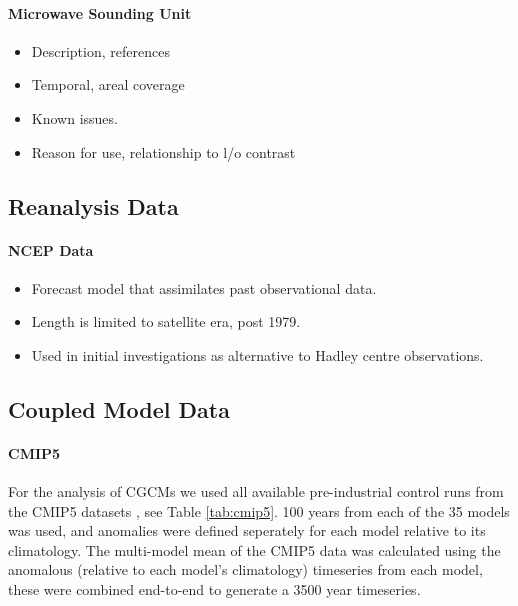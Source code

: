 \paragraph{Microwave Sounding Unit}
\begin{itemize}
	\item Description, references
	\item Temporal, areal coverage
	\item Known issues.
	\item Reason for use, relationship to l/o contrast
\end{itemize}


\subsection{Reanalysis Data}

\paragraph{NCEP Data}
\begin{itemize}
	\item Forecast model that assimilates past observational data.
	\item Length is limited to satellite era, post 1979.
	\item Used in initial investigations as alternative to Hadley centre 
		observations.
\end{itemize}


\subsection{Coupled Model Data}

\paragraph{CMIP5}
For the analysis of CGCMs we used all available pre-industrial control runs from 
the CMIP5 datasets \citep{Taylor2012}, see Table \ref{tab:cmip5}. 100 years from 
each of the 35 models was used, and anomalies were defined seperately for each 
model relative to its climatology. The multi-model mean of the CMIP5 data was 
calculated using the anomalous (relative to each model’s climatology) timeseries 
from each model, these were combined end-to-end to generate a 3500 year 
timeseries. 




